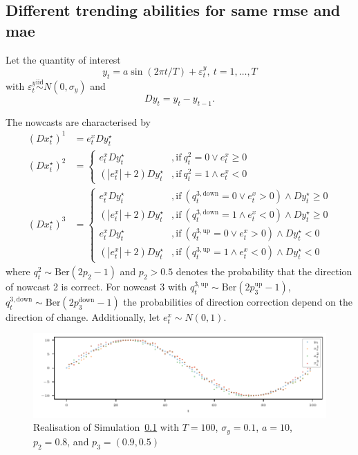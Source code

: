 \documentclass[oneside]{article}
\theoremstyle{plain}%
\theoremstyle{definition}
\newcommand{\ydiff}{D y}
\newcommand{\ydifft}{Dy^\star}
\newcommand{\xdifft}{Dx^\star}
\begin{document}
\subsection{Different trending abilities for same rmse and mae} \label{sec:simulation_rmse_mae}

Let the quantity of interest 
\begin{equation}\label{eq: simulation}
  y_t = a \sin(2 \pi t / T) + \varepsilon_t^y, \ t = 1, \dots, T
\end{equation}
with $\varepsilon_t^y \stackrel{\text{iid}}{\sim} N(0, \sigma_y)$ and 
\begin{equation}
  \ydiff_t = y_t - y_{t-1}. 
\end{equation}

The nowcasts are characterised by 
\begin{align}
	(\xdifft_t)^1 &= e^x_t \ydifft_t \\
	(\xdifft_t)^2 &= \begin{cases}
		e^x_t \ydifft_t &, \text{if}\ q^2_t = 0 \lor e^x_t \geq 0\\
		(| e^x_t | + 2) \ydifft_t &, \text{if}\ q^2_t = 1 \land e^x_t < 0
	\end{cases} \\
	(\xdifft_t)^3 &= \begin{cases}
		e^x_t \ydifft_t &, \text{if}\ (q^{3, \text{down}}_t = 0 \lor e^x_t > 0) \land \ydifft_t \geq 0\\
		(| e^x_t | + 2) \ydifft_t &, \text{if}\ (q^{3, \text{down}}_t = 1 \land e^x_t < 0) \land \ydifft_t \geq 0 \\
		e^x_t \ydifft_t &, \text{if}\ (q^{3, \text{up}}_t = 0 \lor e^x_t > 0) \land \ydifft_t < 0\\
		(| e^x_t | + 2) \ydifft_t &, \text{if}\ (q^{3, \text{up}}_t = 1 \land e^x_t < 0) \land \ydifft_t < 0
	\end{cases}
\end{align}
where $q^2_t \sim \text{Ber}(2p_2 - 1)$ and $p_2 > 0.5$ denotes the probability that the direction of nowcast 2 is correct.
For nowcast 3 with $q^{3, \text{up}}_t \sim \text{Ber}(2p_3^{\text{up}}-1)$, $q^{3, \text{down}}_t \sim \text{Ber}(2p_3^{\text{down}}-1)$ the probabilities of direction correction depend on the direction of change. Additionally, let $e^x_t \sim N(0, 1)$.

\begin{figure}
  \centering
  \includegraphics{plots/simulation_same_rmse_mae/time_series.pdf}
  \caption{Realisation of Simulation~\ref{sec:simulation_rmse_mae} with $T = 100$, $\sigma_y=0.1$, $a = 10$, $p_2 = 0.8$, and $p_3 = (0.9, 0.5)$}
  \label{fig:simulation_rmse_mae_ts}
\end{figure}
\end{document}
